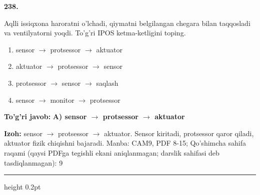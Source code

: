 \documentclass[10pt,a4paper]{article}
\begin{document}
{\bfseries\sffamily\color{ink} 238.}
\par
Aqlli issiqxona haroratni o'lchadi, qiymatni belgilangan chegara bilan taqqosladi va ventilyatorni yoqdi. To'g'ri IPOS ketma-ketligini toping.
\begin{enumerate}[label=\Alph*),leftmargin=9mm]
\item sensor \ensuremath{\rightarrow} protsessor \ensuremath{\rightarrow} aktuator
\item aktuator \ensuremath{\rightarrow} protsessor \ensuremath{\rightarrow} sensor
\item protsessor \ensuremath{\rightarrow} sensor \ensuremath{\rightarrow} saqlash
\item sensor \ensuremath{\rightarrow} monitor \ensuremath{\rightarrow} protsessor
\end{enumerate}
\begin{tcolorbox}[enhanced,breakable,colback=teal!4,colframe=teal!60!black,boxrule=0.45pt,arc=1.2mm,left=2.7mm,right=2.7mm,top=1.8mm,bottom=1.8mm,before skip=2mm,after skip=2mm]
{\bfseries\sffamily\color{teal}To'g'ri javob:} \textbf{A) sensor \ensuremath{\rightarrow} protsessor \ensuremath{\rightarrow} aktuator}
\par\smallskip
{\bfseries Izoh:} sensor \ensuremath{\rightarrow} protsessor \ensuremath{\rightarrow} aktuator. Sensor kiritadi, protsessor qaror qiladi, aktuator fizik chiqishni bajaradi. Manba: CAM9, PDF 8-15; Qo'shimcha sahifa raqami (qaysi PDFga tegishli ekani aniqlanmagan; darslik sahifasi deb tasdiqlanmagan): 9
\end{tcolorbox}
\vspace{2mm}\hrule height 0.2pt\vspace{3mm}
\end{document}
